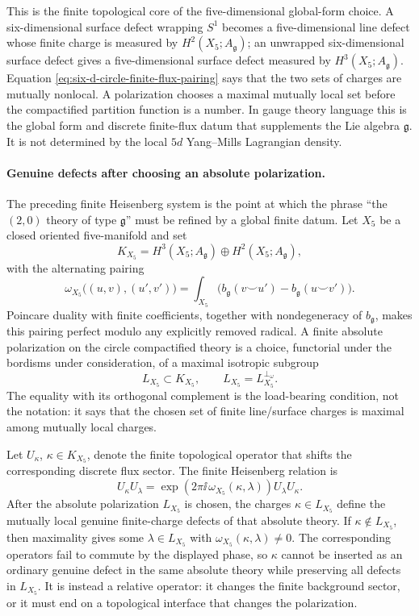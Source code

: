 This is the finite topological core of the five-dimensional global-form
choice.  A six-dimensional surface defect wrapping \(S^1\) becomes a
five-dimensional line defect whose finite charge is measured by
\(H^2(X_5;A_{\mathfrak g})\); an unwrapped six-dimensional surface defect
gives a five-dimensional surface defect measured by
\(H^3(X_5;A_{\mathfrak g})\).  Equation
\eqref{eq:six-d-circle-finite-flux-pairing} says that the two sets of
charges are mutually nonlocal.  A polarization chooses a maximal mutually
local set before the compactified partition function is a number.  In gauge
theory language this is the global form and discrete finite-flux datum that
supplements the Lie algebra \(\mathfrak g\).  It is not determined by the
local \(5d\) Yang--Mills Lagrangian density.

\paragraph{Genuine defects after choosing an absolute polarization.}
The preceding finite Heisenberg system is the point at which the phrase
``the \((2,0)\) theory of type \(\mathfrak g\)'' must be refined by a global
finite datum.  Let \(X_5\) be a closed oriented five-manifold and set
\[
  K_{X_5}
  =
  H^3(X_5;A_{\mathfrak g})
  \oplus
  H^2(X_5;A_{\mathfrak g}),
\]
with the alternating pairing
\[
  \omega_{X_5}\bigl((u,v),(u',v')\bigr)
  =
  \int_{X_5}
  \bigl(
    b_{\mathfrak g}(v\smile u')
    -
    b_{\mathfrak g}(u\smile v')
  \bigr).
\]
Poincare duality with finite coefficients, together with nondegeneracy of
\(b_{\mathfrak g}\), makes this pairing perfect modulo any explicitly
removed radical.  A finite absolute polarization on the circle compactified
theory is a choice, functorial under the bordisms under consideration, of a
maximal isotropic subgroup
\[
  L_{X_5}\subset K_{X_5},
  \qquad
  L_{X_5}=L_{X_5}^{\perp_{\omega}} .
\]
The equality with its orthogonal complement is the load-bearing condition,
not the notation: it says that the chosen set of finite line/surface charges
is maximal among mutually local charges.

Let \(U_\kappa\), \(\kappa\in K_{X_5}\), denote the finite topological
operator that shifts the corresponding discrete flux sector.  The finite
Heisenberg relation is
\[
  U_\kappa U_\lambda
  =
  \exp\!\left(2\pi\ii\,\omega_{X_5}(\kappa,\lambda)\right)
  U_\lambda U_\kappa .
\]
After the absolute polarization \(L_{X_5}\) is chosen, the charges
\(\kappa\in L_{X_5}\) define the mutually local genuine finite-charge
defects of that absolute theory.  If \(\kappa\notin L_{X_5}\), then
maximality gives some \(\lambda\in L_{X_5}\) with
\(\omega_{X_5}(\kappa,\lambda)\ne0\).  The corresponding operators fail to
commute by the displayed phase, so \(\kappa\) cannot be inserted as an
ordinary genuine defect in the same absolute theory while preserving all
defects in \(L_{X_5}\).  It is instead a relative operator: it changes the
finite background sector, or it must end on a topological interface that
changes the polarization.

